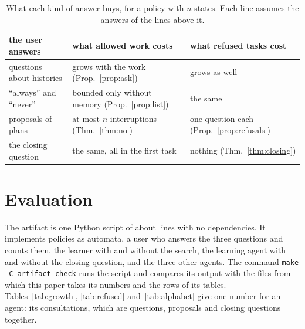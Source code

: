 \documentclass[acmsmall,nonacm,screen]{acmart}
\begin{document}
\begin{table}
\caption{What each kind of answer buys, for a policy with $n$ states. Each line assumes the
answers of the lines above it.}
\label{tab:buys}
\small
\begin{tabular}{lll}
\toprule
the user answers & what allowed work costs & what refused tasks cost \\
\midrule
questions about histories & grows with the work (Prop.~\ref{prop:ask}) & grows as well \\
``always'' and ``never'' & bounded only without memory (Prop.~\ref{prop:list}) & the same \\
proposals of plans & at most $n$ interruptions (Thm.~\ref{thm:no}) & one question each (Prop.~\ref{prop:refusals}) \\
the closing question & the same, all in the first task & nothing (Thm.~\ref{thm:closing}) \\
\bottomrule
\end{tabular}
\end{table}

\section{Evaluation}
\label{sec:eval}

The artifact is one Python script of about \exLines{} lines with no dependencies. It
implements policies as automata, a user who answers the three questions and counts them, the
learner with and without the search, the learning agent with and without the closing
question, and the three other agents. The command \texttt{make -C artifact check} runs the
script and compares its output with the files from which this paper takes its numbers and
the rows of its tables. Tables~\ref{tab:growth}, \ref{tab:refused} and~\ref{tab:alphabet}
give one number for an agent: its consultations, which are questions, proposals and closing
questions together.
\end{document}
